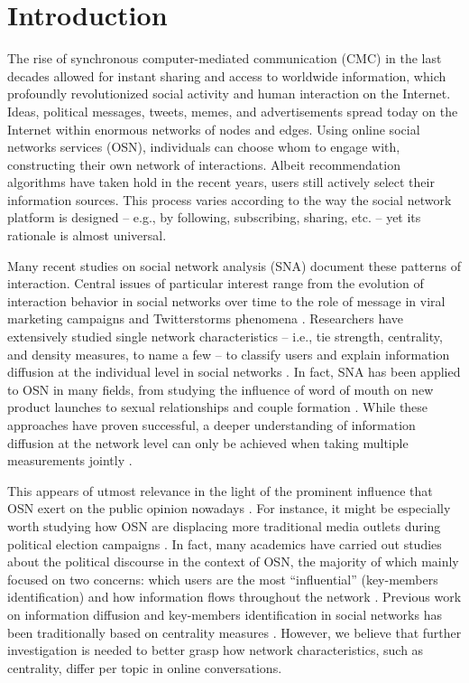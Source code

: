 \section{Introduction}\label{Introduction}\thispagestyle{SectionFirstPage} %
The rise of synchronous computer-mediated communication (CMC) in the last decades allowed for instant sharing and access to worldwide information, which profoundly revolutionized social activity and human interaction on the Internet. Ideas, political messages, tweets, memes, and advertisements spread today on the Internet within enormous networks of nodes and edges. Using online social networks services (OSN), individuals can choose whom to engage with, constructing their own network of interactions. Albeit recommendation algorithms have taken hold in the recent years, users still actively select their information sources. This process varies according to the way the social network platform is designed – e.g., by following, subscribing, sharing, etc. – yet its rationale is almost universal.

Many recent studies on social network analysis (SNA) document these patterns of interaction. Central issues of particular interest range from the evolution of interaction behavior in social networks over time \citep[e.g.,][]{mulder:2019} to the role of message in viral marketing campaigns \citep[e.g.,][]{liu-thompkins:2012} and Twitterstorms phenomena \citep[e.g.,][]{timm:2016}.
Researchers have extensively studied single network characteristics – i.e., tie strength, centrality, and density measures, to name a few – to classify users and explain information diffusion at the individual level in social networks \citep{granovetter:1973, borgatti:2005}.
In fact, SNA has been applied to OSN in many fields, from studying the influence of word of mouth on new product launches \citep[e.g.,][]{deer:2019} to sexual relationships and couple formation \citep[e.g.,][]{ortega:2017}. While these approaches have proven successful, a deeper understanding of information diffusion at the network level can only be achieved when taking multiple measurements jointly \citep{himelboim:2017}.

This appears of utmost relevance in the light of the prominent influence that OSN exert on the public opinion nowadays \citep{kwak:2010, lerman:2010}. For instance, it might be especially worth studying how OSN are displacing more traditional media outlets during political election campaigns \citep[see, e.g.,][]{hemsley:2019, buccoliero:2020, kruikemeier:2014}.
In fact, many academics have carried out studies about the political discourse in the context of OSN, the majority of which mainly focused on two concerns: which users are the most ``influential'' (key-members identification) and how information flows throughout the network \citep[as cited in][]{bode:2016}. Previous work on information diffusion and key-members identification in social networks has been traditionally based on centrality measures \citep{freeman:1978}. However, we believe that further investigation is needed to better grasp how network characteristics, such as centrality, differ per topic in online conversations.

